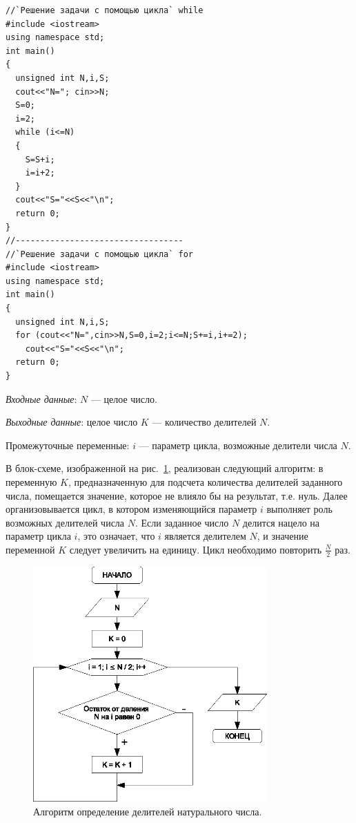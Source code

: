 \begin{lstlisting}
//`Решение задачи с помощью цикла` while
#include <iostream>
using namespace std;
int main()
{
  unsigned int N,i,S;
  cout<<"N="; cin>>N;
  S=0;
  i=2;
  while (i<=N)
  {
    S=S+i;
    i=i+2;
  }
  cout<<"S="<<S<<"\n";
  return 0;
}
//----------------------------------
//`Решение задачи с помощью цикла` for
#include <iostream>
using namespace std;
int main()
{
  unsigned int N,i,S;
  for (cout<<"N=",cin>>N,S=0,i=2;i<=N;S+=i,i+=2);
    cout<<"S="<<S<<"\n";
  return 0;
}
\end{lstlisting}


\emph{Входные данные}: $N$ --- целое число.

\emph{Выходные данные}: целое число $K$ --- количество делителей $N$.

Промежуточные переменные: $i$ --- параметр цикла, возможные делители числа $N$.

В блок-схеме, изображенной на рис.~\ref{ch03:refDrawing30}, реализован следующий алгоритм: в переменную $K$,
предназначенную для подсчета количества делителей заданного числа, помещается значение, которое не влияло бы на
результат, т.е. нуль. Далее организовывается цикл, в котором изменяющийся параметр $i$ выполняет роль
возможных делителей числа $N$. Если заданное число $N$ делится нацело на параметр цикла $i$, это
означает, что $i$ является делителем $N$, и значение переменной $K$
следует увеличить на единицу. Цикл необходимо повторить $\frac{N}{2}$ раз.

\begin{figure}[htb]
\begin{center}
\includegraphics[width=0.8\textwidth]{img/ris_3_31}
\caption{Алгоритм определение делителей натурального числа.}
\label{ch03:refDrawing30}
\end{center}
\end{figure}


